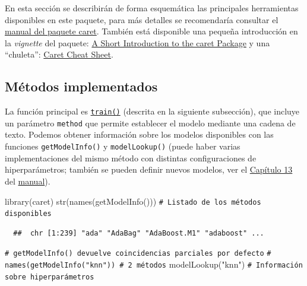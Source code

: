 \documentclass[
]{book}
\newenvironment{Shaded}{\begin{snugshade}}{\end{snugshade}}
\newcommand{\CommentTok}[1]{\textcolor[rgb]{0.56,0.35,0.01}{\textit{#1}}}
\newcommand{\FunctionTok}[1]{\textcolor[rgb]{0.00,0.00,0.00}{#1}}
\newcommand{\NormalTok}[1]{#1}
\newcommand{\StringTok}[1]{\textcolor[rgb]{0.31,0.60,0.02}{#1}}
\theoremstyle{break}
\theoremstyle{nonumberplain}
\renewcommand{\CommentTok}[1]{\textcolor[rgb]{0.41,0.41,0.41}{\texttt{#1}}}
\begin{document}
En esta sección se describirán de forma esquemática las principales herramientas disponibles en este paquete, para más detalles se recomendaría consultar el \href{https://topepo.github.io/caret}{manual del paquete caret}.
También está disponible una pequeña introducción en la \emph{vignette} del paquete: \href{https://cran.r-project.org/web/packages/caret/vignettes/caret.html}{A Short Introduction to the caret Package} y una ``chuleta'': \href{https://raw.githubusercontent.com/rstudio/cheatsheets/master/caret.pdf}{Caret Cheat Sheet}.

\hypertarget{muxe9todos-implementados}{%
\subsection{Métodos implementados}\label{muxe9todos-implementados}}

La función principal es \href{https://rdrr.io/pkg/caret/man/train.html}{\texttt{train()}} (descrita en la siguiente subsección), que incluye un parámetro \texttt{method} que permite establecer el modelo mediante una cadena de texto.
Podemos obtener información sobre los modelos disponibles con las funciones \texttt{getModelInfo()} y \texttt{modelLookup()} (puede haber varias implementaciones del mismo método con distintas configuraciones de hiperparámetros; también se pueden definir nuevos modelos, ver el \href{https://topepo.github.io/caret/using-your-own-model-in-train.html}{Capítulo 13} del \href{https://topepo.github.io/caret}{manual}).

\begin{Shaded}
\begin{Highlighting}[]
\FunctionTok{library}\NormalTok{(caret)}
\FunctionTok{str}\NormalTok{(}\FunctionTok{names}\NormalTok{(}\FunctionTok{getModelInfo}\NormalTok{()))  }\CommentTok{\# Listado de los métodos disponibles}
\end{Highlighting}
\end{Shaded}

\begin{verbatim}
  ##  chr [1:239] "ada" "AdaBag" "AdaBoost.M1" "adaboost" ...
\end{verbatim}

\begin{Shaded}
\begin{Highlighting}[]
\CommentTok{\# getModelInfo() devuelve coincidencias parciales por defecto}
\CommentTok{\# names(getModelInfo("knn")) \# 2 métodos}
\FunctionTok{modelLookup}\NormalTok{(}\StringTok{"knn"}\NormalTok{)  }\CommentTok{\# Información sobre hiperparámetros}
\end{Highlighting}
\end{Shaded}
\end{document}

